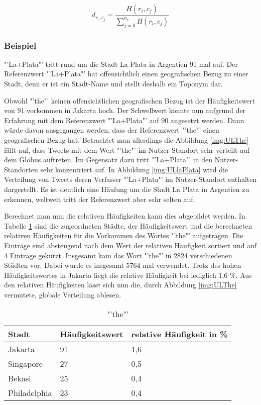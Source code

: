 				\begin{equation}
					d_{r_i,c_j}=\frac{H(r_i,c_j)}{\sum^{n_c}_{j=0}{H(r_i,c_j)}}
				\end{equation}	

			\subsubsection{Beispiel} 

				"'La+Plata"' tritt rund um die Stadt La Plata in Argentien 91 mal auf.
				Der Referenzwert "'La+Plata"' hat offensichtlich einen geografischen Bezug zu einer Stadt, denn er ist ein Stadt-Name und stellt deshalb ein Toponym dar. 

				Obwohl "'the"' keinen offensichtlichen geografischen Bezug ist der Häufigkeitswert von 91 vorkommen in Jakarta hoch.
				Der Schwellwert könnte nun aufgrund der Erfahrung mit dem Referenzwert "'La+Plata"' auf 90 angesetzt werden.
				Dann würde davon ausgegangen werden, dass der Referenzwert "'the"' einen geografischen Bezug hat.
				Betrachtet man allerdings die Abbildung \ref{img:ULThe} fällt auf, dass Tweets mit dem Wert "'the"' im Nutzer-Standort sehr verteilt auf dem Globus auftreten.
				Im Gegensatz dazu tritt "'La+Plata"' in den Nutzer-Standorten sehr konzentriert auf.
				In Abbildung \ref{img:ULlaPlata} wird die Verteilung von Tweets deren Verfasser "'La+Plata"' im Nutzer-Standort enthalten dargestellt. 
				Es ist deutlich eine Häufung um die Stadt La Plata in Argentien zu erkennen, weltweit tritt der Referenzwert aber sehr selten auf.
				
				Berechnet man nun die relativen Häufigkeiten kann dies abgebildet werden.
				In Tabelle \ref{tab:the} sind die zugeordneten Städte, der Häufigkeitswert und die berechneten relativen Häufigkeiten für die Vorkommen des Wortes "'the"' aufgetragen. 
				Die Einträge sind absteugend nach dem Wert der relativen Häufigkeit sortiert und auf 4 Einträge gekürzt.
				Insgesamt kam das Wort "'the"' in 2824 verschiedenen Städten vor.
				Dabei wurde es insgesamt 5764 mal verwendet. 
				Trotz des hohen Häufigkeitswertes in Jakarta liegt die relative Häufigkeit bei lediglich 1,6 \%.
				Aus den relativen Häufigkeiten lässt sich nun die, durch Abbildung \ref{img:ULThe} vermutete, globale Verteilung ablesen.


				\begin{table}[h]
				\centering
				\caption{"'the"'}
				\label{tab:the}
				\begin{tabular}{|l|l|l|}
				\hline
				Stadt             & Häufigkeitswert & relative Häufigkeit in \% \\ \hline \hline
				Jakarta           & 91              & 1,6                       \\ \hline
				Singapore         & 27              & 0,5                       \\ \hline
				Bekasi            & 25              & 0,4                       \\ \hline
				Philadelphia      & 23              & 0,4                       \\ \hline
				\end{tabular}
				\end{table}

